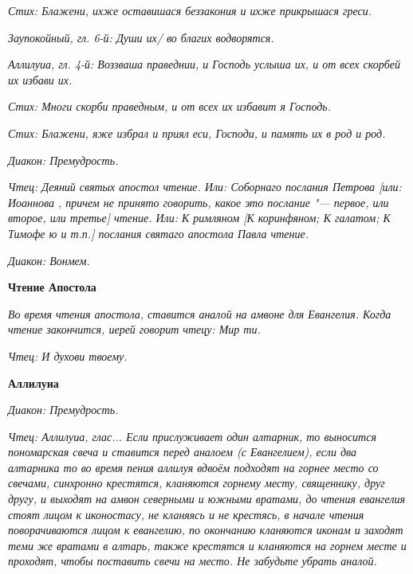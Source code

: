 \itshape Стих:\normalfont{} Блажени, ихже оставишася беззакония и ихже прикрышася греси.


\itshape Заупокойный, гл. 6-й:\normalfont{} Души их/ во благих водворятся.


\itshape Аллилуиа, гл. 4-й:\normalfont{} Воззваша праведнии, и Господь услыша их, и от всех скорбей их избави их.


\itshape Стих:\normalfont{} Многи скорби праведным, и от всех их избавит я Господь.


\itshape Стих:\normalfont{} Блажени, яже избрал и приял еси, Господи, и память их в род и род.


\itshape Диакон:\normalfont{} Премудрость.


\itshape Чтец:\normalfont{} Деяний святых апостол чтение. \itshape Или:\normalfont{} Соборнаго послания Петрова \itshape [или:\normalfont{} Иоаннова \itshape , причем не принято говорить, какое это послание "--- первое, или второе, или третье\normalfont{}] чтение. \itshape Или:\normalfont{} К римляном [К коринфяном; К галатом; К Тимофе \itshape ю и т.п.\normalfont{}] послания святаго апостола Павла чтение.


\itshape Диакон:\normalfont{} Вонмем.





\bfseries Чтение Апостола\normalfont{}


\itshape Во время чтения апостола, ставится аналой на амвоне для Евангелия. Когда чтение закончится, иерей говорит чтецу:\normalfont{} Мир ти.


\itshape Чтец:\normalfont{} И духови твоему.





\bfseries Аллилуиа\normalfont{}


\itshape Диакон:\normalfont{} Премудрость.


\itshape Чтец:\normalfont{} Аллилуиа, глас... \itshape Если прислуживает один алтарник, то выносится пономарская свеча и ставится перед аналоем (с Евангелием), если два алтарника то во время пения аллилуя вдвоём подходят на горнее место со свечами, синхронно крестятся, кланяются горнему месту, священнику, друг другу, и выходят на амвон северными и южными вратами, до чтения евангелия стоят лицом к иконостасу, не кланяясь и не крестясь, в начале чтения поворачиваются лицом к евангелию, по окончанию кланяются иконам и заходят теми же вратами в алтарь, также крестятся и кланяются на горнем месте и проходят, чтобы поставить свечи на место. Не забудьте убрать аналой.\normalfont{}


